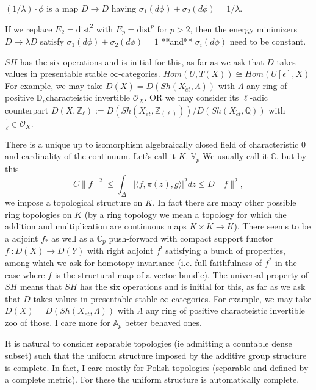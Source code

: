 \documentclass[12pt,letterpaper]{book}
\newcommand{\dist}{\text{dist}}
\begin{document}
$(1/\lambda)\cdot \phi$ is a map $D \to D$ having $\sigma_1(d\phi)+\sigma_2(d\phi)=1/\lambda$. 

If we replace $E_2=\dist^2$ with $E_p=\dist^p$ for $p>2$, then the energy minimizers $D \to \lambda D$ satisfy $\sigma_1(d\phi)+\sigma_2(d\phi)=1$ **and** $\sigma_i(d\phi)$ need to be constant.

$SH$ has the six operations and is initial for this, as far as we ask that $D$ takes values in presentable 
stable $\infty$-categories. $Hom(U,T(X)) \cong Hom(U[\epsilon],X)$ For example, we may take $D(X)=D(Sh(X_{\acute{e}t},\Lambda))$ with $\Lambda$ any ring of positive $\mathbb{D}_p$characteistic invertible 
$\mathcal{O}_X$. OR we may consider its $\ell$-adic counterpart $D(X,\mathbb{Z}_{\ell}):=D(Sh(X_{\acute{e}t},\mathbb{Z}_{(\ell)}))/D(Sh(X_{\acute{e}t},\mathbb{Q}))$ with $\frac{1}{\ell}\in\mathcal{O}_X$.

There is a unique up to isomorphism algebraically closed field of characteristic 0 and cardinality of the continuum. Let's call it $K$. $\mathbb{V}_p$
We usually call it $\mathbb{C}$, but by this $$
C\|f\|^2 \leq \int_{\Delta}|\langle f,\pi(z),g\rangle|^2dz \leq D\|f\|^2,
$$ we impose a topological structure on $K$. In fact there are many other possible ring topologies on $K$ (by a ring topology we mean a topology for which the addition and multiplication are continuous maps $K\times K \to K$).
There seems to be a 
adjoint $f_*$ as well as a $\mathbb{C}_p$ push-forward with compact support functor $f_!:D(X)\to D(Y)$ with right adjoint $f^!$ satisfying a 
bunch of properties, among which we ask for homotopy invariance (i.e. full faithfulness of $f^*$ in the case where $f$ is the structural map of a vector bundle). 
The universal property of $SH$ means that $SH$ has the six operations and is initial for this, as far as we ask that $D$ takes values in presentable 
stable $\infty$-categories. For example, we may take $D(X)=D(Sh(X_{\acute{e}t},\Lambda))$ with $\Lambda$ any ring of positive characteistic invertible 
zoo of those. I care more for $\mathbb{A}_p$ better behaved ones.

It is natural to consider separable topologies (ie admitting a countable dense subset) such that the uniform structure imposed by the additive group structure is complete. In fact, I care mostly for Polish topologies (separable and defined by a complete metric). For these the uniform structure is automatically complete.
\end{document}
